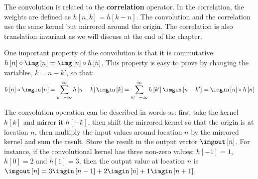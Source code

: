 The convolution is related to the {\bf correlation} operator. In the correlation, the weights are defined as $h\left[n, k \right]=h\left[k-n \right]$. The convolution and the correlation use the same kernel but mirrored around the origin.
The correlation is also translation invariant as we will discuss at the end of the chapter. 


One important property of the convolution is that it is commutative:
 $h\left[n\right] \circ \img \left[n\right] = \img \left[n\right] \circ h\left[n\right]$.
This property is easy to prove by changing the variables, $k = n - k'$, so that:
\begin{equation}
h \left[n\right] \circ \imgin \left[n\right] =  
\sum_{k=-\infty}^{\infty} h \left[n-k \right] \imgin \left[k \right] = \sum_{k'=-\infty}^{\infty} h \left[k' \right] \imgin \left[n-k' \right]  = 
\imgin \left[n\right] \circ h \left[n\right]
\end{equation}

The convolution operation can be described in words as: first take the kernel $h\left[k\right]$ and mirror it $h\left[-k \right]$, then shift the mirrored kernel so that the origin is at location $n$, then multiply the input values around location $n$ by the mirrored kernel and sum the result. Store the result in the output vector $\imgout \left[n\right]$. For instance, if the convolutional kernel has three non-zero values: $h\left[-1 \right] =1$,  $h\left[0 \right] = 2$ and $h\left[1 \right] = 3$, then the output value at location $n$ is $\imgout \left[n\right] = 3 \imgin \left[n-1\right]+2 \imgin \left[n\right] + 1 \imgin \left[n+1\right]$.


